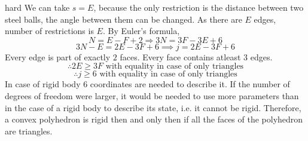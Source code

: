 \begin{solution}{hard}
We can take $s=E$, because the only restriction is the distance between two steel balls, the angle between them can be changed. As there are $E$ edges, number of restrictions is $E$.
By Euler’s formula,
$$ N = E-F+2 \Rightarrow 3N = 3F-3E + 6$$
$$3N - E = 2E - 3F + 6 \implies j = 2E - 3F + 6$$
Every edge is part of exactly $2$ faces. Every face contains atleast $3$ edges.
$$\therefore 2E \geq 3F\,\,\text{with equality in case of only triangles}$$
$$\therefore j \geq 6 \,\,\text{with equality in case of only triangles}$$
In case of rigid body 6 coordinates are needed to describe it. If the number of degrees of freedom were larger, it would be needed to use more parameters than in the case of a rigid body to describe its state, i.e. it cannot be rigid. Therefore, a convex polyhedron is rigid then and only then if all the faces of the polyhedron are triangles.
\end{solution}